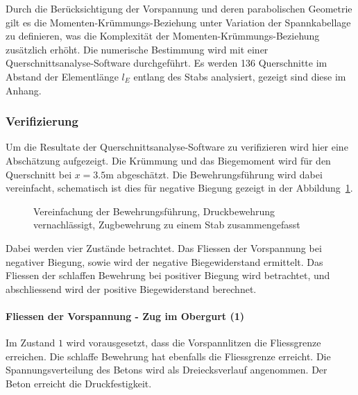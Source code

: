 \documentclass[
  11pt,
  letterpaper,
]{scrreprt}
\let\oldparagraph\paragraph
\renewcommand{\paragraph}[1]{\oldparagraph{#1}\mbox{}}
\begin{document}
Durch die Berücksichtigung der Vorspannung und deren parabolischen
Geometrie gilt es die Momenten-Krümmungs-Beziehung unter Variation der
Spannkabellage zu definieren, was die Komplexität der
Momenten-Krümmungs-Beziehung zusätzlich erhöht. Die numerische
Bestimmung wird mit einer Querschnittsanalyse-Software durchgeführt. Es
werden 136 Querschnitte im Abstand der Elementlänge \(l_E\) entlang des
Stabs analysiert, gezeigt sind diese im Anhang.

\subsubsection{Verifizierung}\label{verifizierung}

Um die Resultate der Querschnittsanalyse-Software zu verifizieren wird
hier eine Abschätzung aufgezeigt. Die Krümmung und das Biegemoment wird
für den Querschnitt bei \(x=3.5\)m abgeschätzt. Die Bewehrungsführung
wird dabei vereinfacht, schematisch ist dies für negative Biegung
gezeigt in der Abbildung~\ref{fig-t6_qs_approx}.

\begin{figure}[H]


\caption{\label{fig-t6_qs_approx}Vereinfachung der Bewehrungsführung,
Druckbewehrung vernachlässigt, Zugbewehrung zu einem Stab
zusammengefasst}

\end{figure}%

Dabei werden vier Zustände betrachtet. Das Fliessen der Vorspannung bei
negativer Biegung, sowie wird der negative Biegewiderstand ermittelt.
Das Fliessen der schlaffen Bewehrung bei positiver Biegung wird
betrachtet, und abschliessend wird der positive Biegewiderstand
berechnet.

\paragraph{Fliessen der Vorspannung - Zug im Obergurt
(1)}\label{fliessen-der-vorspannung---zug-im-obergurt-1}

Im Zustand \(1\) wird vorausgesetzt, dass die Vorspannlitzen die
Fliessgrenze erreichen. Die schlaffe Bewehrung hat ebenfalls die
Fliessgrenze erreicht. Die Spannungsverteilung des Betons wird als
Dreiecksverlauf angenommen. Der Beton erreicht die Druckfestigkeit.
\end{document}
